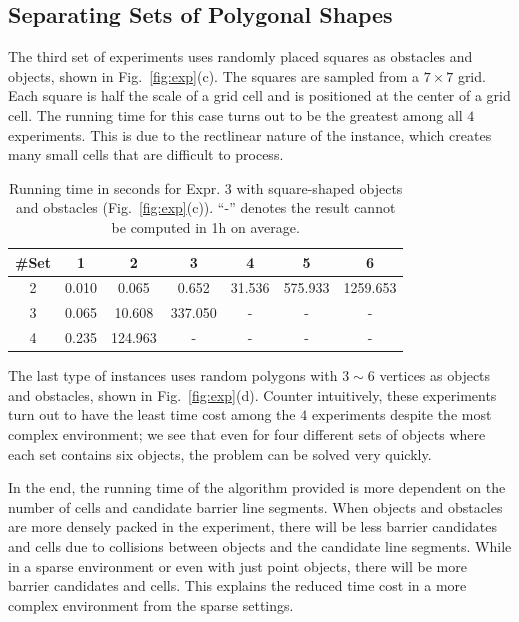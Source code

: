 \subsection{Separating Sets of Polygonal Shapes}
The third set of experiments uses randomly placed squares as obstacles and objects, shown in Fig.~\ref{fig:exp}(c). The squares are sampled from a $7\times7$ grid. Each square is half the scale of a grid cell and is positioned at the center of a grid cell. The running time for this case turns out to be the greatest among all $4$ experiments. This is due to the rectlinear nature of the instance, which creates many small cells that are difficult to process. 

\begin{table}[ht]
    \centering
    \begin{tabular}{|c|c|c|c|c|c|c|}\hline
         \#Set &  1 & 2 & 3 & 4& 5& 6\\\hline
 2 & 0.010 & 0.065 & 0.652 & 31.536 & 575.933 & 1259.653\\\hline
 3 & 0.065 & 10.608 & 337.050 & - & - & -\\\hline
 4 & 0.235 & 124.963 & - & - & - & -\\\hline
    \end{tabular}
    \caption{Running time in seconds for Expr. 3 with square-shaped objects and obstacles (Fig.~\ref{fig:exp}(c)). ``-'' denotes the result cannot be computed in 1h on average. 
    }
    \label{tab:expr_3}
    \vspace{-2mm}
\end{table}
 
The last type of instances uses random polygons with $3\sim 6$ vertices
as objects and obstacles, shown in Fig.~\ref{fig:exp}(d). 
Counter intuitively, these experiments turn out to have the least time cost among the $4$ experiments despite the most complex environment; we see that even for four different sets of objects where each set contains six objects, the problem can be solved very quickly. %

In the end, the running time of the algorithm provided is more dependent on the number of cells and candidate barrier line segments. 
When objects and obstacles are more densely packed in the experiment, 
there will be less barrier candidates and cells due to collisions between objects and the candidate line segments.
While in a sparse environment or even with just point objects, there will be more barrier candidates and cells.
This explains the reduced time cost in a more complex environment from the sparse settings.

